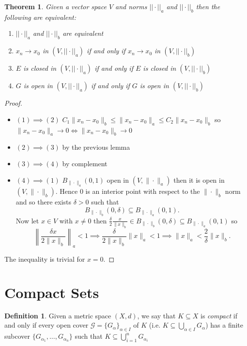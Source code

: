 \documentclass[11pt,openany]{book}
\theoremstyle{plain}
\newtheorem{theorem}{Theorem}[chapter]
\theoremstyle{definition}
\newtheorem{definition}{Definition}[chapter]
\theoremstyle{remark}
\begin{document}
\begin{theorem}
    Given a vector space $V$ and norms $||\cdot||_a$ and $||\cdot||_{b}$ then the following are equivalent:
    \begin{enumerate}
        \item $||\cdot||_a$ and $||\cdot||_b$ are equivalent
        \item $x_n \to x_0$ in $(V, ||\cdot||_a)$ if and only if $x_n \to x_0$ in $(V, ||\cdot||_b)$
        \item $E$ is closed in $(V, ||\cdot||_a)$ if and only if $E$ is closed in $(V, ||\cdot||_b)$
        \item $G$ is open in $(V, ||\cdot||_a)$ if and only if $G$ is open in $(V, ||\cdot||_b)$
    \end{enumerate}
\end{theorem}
\begin{proof}
    \begin{itemize}
        \item $(1) \implies (2)$ $C_1\|x_n - x_0\|_b \le \|x_n -x_0\|_a \le C_2 \|x_n - x_0\|_b$ so $\|x_n - x_0\|_a \to 0 \iff \|x_n - x_0\|_b \to 0$
        \item $(2) \implies (3)$ by the previous lemma
        \item $(3) \implies (4)$ by complement
        \item $(4) \implies (1)$ $B_{\|\cdot\|_a}(0,1)$ open in $(V, \|\cdot\|_a)$ then it is open in $(V, \|\cdot\|_b)$. Hence $0$ is an interior point with respect to the $\|\cdot\|_b$ norm and so there  exists $\delta >0$ such that $$B_{\|\cdot\|_b}(0,\delta) \subseteq B_{\|\cdot\|_a}(0,1).$$
        Now let $x \in V$ with $x \ne 0$ then $ \frac{\delta}{2} \frac{x}{\|x\|_b} \in B_{\|\cdot\|_b}(0,\delta)\subseteq B_{\|\cdot\|_a}(0,1)$ so \[ \left\|\frac{\delta x}{2 \|x\|_b}\right\|_a < 1\implies \frac{\delta}{2\|x\|_b}\|x\|_a < 1\implies \|x\|_a < \frac{2}{\delta}\|x\|_b.\]
    \end{itemize}
    The inequality is trivial for $x=0$.
\end{proof}

\section{Compact Sets}
\begin{definition}
    Given a metric space $(X,d)$, we say that $K\subseteq X$ is \emph{compact} if and only if every open cover $\mathcal{G} = \{G_{\alpha} \}_{\alpha \in I}$ of $K$ (i.e. $K \subseteq \bigcup_{\alpha \in I} G_{\alpha}$) has a finite subcover $\{G_{\alpha_1}, \dots , G_{\alpha_n}\}$ such that $K \subseteq \bigcup_{i=1}^n G_{\alpha_i}$
\end{definition}
\end{document}
